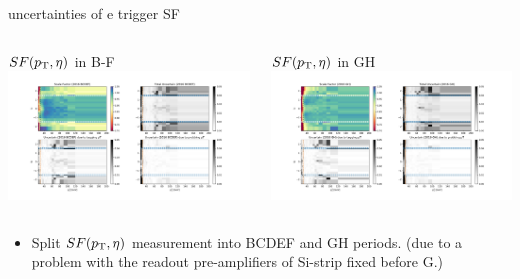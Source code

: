 \begin{frame}{uncertainties of e trigger SF}
\smaller
    \begin{columns}
        \begin{block}{$SF (p_{\mathrm{T}}, \eta)$ in B-F}
            \includegraphics[width=\textwidth,trim=3cm 0 3cm 0, clip]{chapters/Analysis/sectionCalibration/figures/eTrigger/result_BCDEF.png}
        \end{block}
        
        \begin{block}{$SF (p_{\mathrm{T}}, \eta)$ in GH}
            \includegraphics[width=\textwidth,trim=3cm 0 3cm 0, clip]{chapters/Analysis/sectionCalibration/figures/eTrigger/result_GH.png}
        \end{block}
    \end{columns}

    \vspace{0.05\textheight}
    \begin{itemize}
        \item Split $SF (p_{\mathrm{T}}, \eta)$ measurement into BCDEF and GH periods. (due to a problem with the readout pre-amplifiers of Si-strip fixed before G.)
                    

\end{itemize}
\end{frame}
